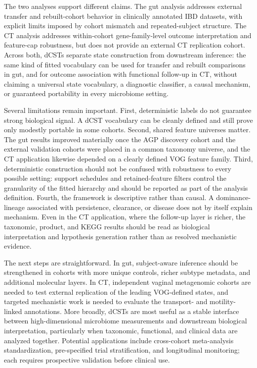 \documentclass[11pt]{article}
\begin{document}
The two analyses support different claims. The gut
analysis addresses external transfer and rebuilt-cohort behavior in clinically
annotated IBD datasets, with explicit limits imposed by cohort mismatch and
repeated-subject structure. The CT analysis addresses within-cohort
gene-family-level outcome interpretation and feature-cap robustness, but does
not provide an external CT replication cohort. Across both, dCSTs separate
state construction from downstream inference: the same kind of fitted
vocabulary can be used for transfer and rebuilt comparisons in gut, and for
outcome association with functional follow-up in CT, without claiming a
universal state vocabulary, a diagnostic classifier, a causal mechanism, or
guaranteed portability in every microbiome setting.

Several limitations remain important. First, deterministic labels do not
guarantee strong biological signal. A dCST vocabulary can be cleanly defined
and still prove only modestly portable in some cohorts. Second, shared feature
universes matter. The gut results improved materially once the AGP discovery
cohort and the external validation cohorts were placed in a common taxonomy
universe, and the CT application likewise depended on a clearly defined VOG
feature family. Third, deterministic construction should not be confused with
robustness to every possible setting: support schedules and retained-feature
filters control the granularity of the fitted hierarchy and should be reported
as part of the analysis definition. Fourth, the framework is descriptive rather
than causal. A
dominance-lineage associated with persistence, clearance, or disease does not
by itself explain mechanism. Even in the CT application, where the follow-up
layer is richer, the taxonomic, product, and KEGG results should be read as
biological interpretation and hypothesis generation rather than as resolved
mechanistic evidence.

The next steps are straightforward. In gut, subject-aware inference should be
strengthened in cohorts with more unique controls, richer subtype metadata, and
additional molecular layers. In CT, independent vaginal metagenomic cohorts are
needed to test external replication of the leading VOG-defined states, and
targeted mechanistic work is needed to evaluate the transport- and
motility-linked annotations. More broadly, dCSTs are most useful as a stable
interface between high-dimensional microbiome measurements and downstream
biological interpretation, particularly when taxonomic, functional, and clinical
data are analyzed together. Potential applications include cross-cohort
meta-analysis standardization, pre-specified trial stratification, and
longitudinal monitoring; each requires prospective validation before clinical
use.
\end{document}
